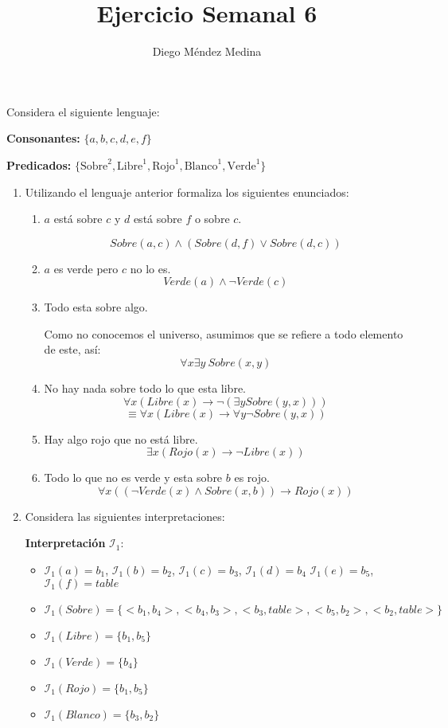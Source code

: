 \documentclass[8pt, letterpaper]{article}
\title{%
  Ejercicio Semanal 6\\
  {\large{}}}
\author{Diego Méndez Medina}
\date{}
\begin{document}
\ttfamily
\maketitle
\rmfamily
Considera el siguiente lenguaje:

\hfill\break
{\bf Consonantes:} $\{a, b, c, d, e, f\}$

\hfill\break
{\bf Predicados:} $\{\text{Sobre}^2, \text{Libre}^1, \text{Rojo}^1,
\text{Blanco}^1, \text{Verde}^1\}$

\begin{enumerate}
\item Utilizando el lenguaje anterior formaliza los siguientes enunciados:
  \begin{enumerate}
  \item $a$ está sobre $c$ y $d$ está sobre $f$ o sobre $c$.

    $$Sobre(a, c) \land (Sobre(d, f) \lor Sobre(d, c))$$
  \item $a$ es verde pero $c$ no lo es.
    $$Verde(a) \land \neg Verde(c)$$
  \item Todo esta sobre algo.
    
    Como no conocemos el universo, asumimos que se refiere a todo elemento
    de este, así:
    $$\forall x \exists y\ Sobre(x,y)$$
  \item No hay nada sobre todo lo que esta libre.
    $$\forall x (Libre(x)\rightarrow \neg(\exists y Sobre(y,x)))$$
    $$\equiv \forall x (Libre(x)\rightarrow \forall y \neg Sobre(y,x))$$
  \item Hay algo rojo que no está libre.
    $$\exists x(Rojo(x) \rightarrow \neg Libre(x))$$
  \item Todo lo que no es verde y esta sobre $b$ es rojo.
    $$\forall x((\neg Verde(x) \land Sobre(x, b)) \rightarrow Rojo(x))$$
  \end{enumerate}
\item Considera las siguientes interpretaciones:
  
  {\bf Interpretación} $\mathcal{I}_1:$
  \begin{itemize}
  \item $\mathcal{I}_1(a) = b_1$, $\mathcal{I}_1(b) = b_2$,
    $\mathcal{I}_1(c) = b_3$, $\mathcal{I}_1(d) = b_4$
    $\mathcal{I}_1(e) = b_5$, $\mathcal{I}_1(f) = table$
  \item $\mathcal{I}_1(Sobre) = \{<b_1, b_4>, <b_4, b_3>, <b_3, table>,
    <b_5, b_2>, <b_2, table>\}$
  \item $\mathcal{I}_1(Libre) = \{b_1, b_5\}$
  \item $\mathcal{I}_1(Verde) = \{b_4\}$
  \item $\mathcal{I}_1(Rojo) = \{b_1, b_5\}$
  \item $\mathcal{I}_1(Blanco) = \{b_3, b_2\}$
  \end{itemize}


\end{enumerate}
\end{document}
